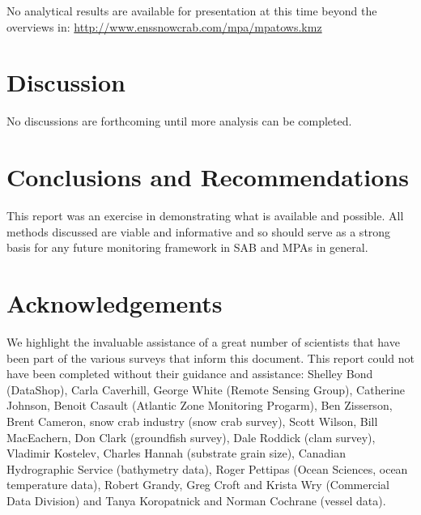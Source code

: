 \documentclass[letterpaper,portrait,11pt]{scrartcl}
\numberwithin{equation}{section}    %
\numberwithin{figure}{section}    %
\numberwithin{table}{section}       %
\begin{document}
No analytical results are available for presentation at this time beyond the overviews in: \url{http://www.enssnowcrab.com/mpa/mpatows.kmz}



\section{Discussion}
\label{sec:discussion}
No discussions are forthcoming until more analysis can be completed.

\section{Conclusions and Recommendations}
\label{sec:conclusions}


This report was an exercise in demonstrating what is available and possible. All methods discussed are viable and informative and so should serve as a strong basis for any future monitoring framework in SAB and MPAs in general. 


\newpage
\section*{Acknowledgements}

We highlight the invaluable assistance of a great number of scientists that have been part of the various surveys that inform this document. This report could not have been completed without their guidance and assistance: Shelley Bond (DataShop), Carla Caverhill, George White (Remote Sensing Group), Catherine Johnson, Benoit Casault (Atlantic Zone Monitoring Progarm), Ben Zisserson, Brent Cameron, snow crab industry (snow crab survey), Scott Wilson, Bill MacEachern, Don Clark (groundfish survey), Dale Roddick (clam survey), Vladimir Kostelev, Charles Hannah (substrate grain size), Canadian Hydrographic Service (bathymetry data), Roger Pettipas (Ocean Sciences, ocean temperature data), Robert Grandy, Greg Croft and Krista Wry (Commercial Data Division) and Tanya Koropatnick and Norman Cochrane (vessel data).


\clearpage

\printbibliography
\end{document}
